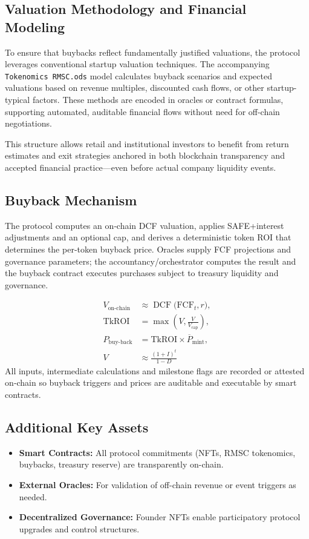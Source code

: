 \documentclass[conference]{IEEEtran}
\begin{document}
\subsection{Valuation Methodology and Financial Modeling}
To ensure that buybacks reflect fundamentally justified valuations, the protocol leverages conventional startup valuation techniques. The accompanying \texttt{Tokenomics RMSC.ods} model calculates buyback scenarios and expected valuations based on revenue multiples, discounted cash flows, or other startup-typical factors. These methods are encoded in oracles or contract formulas, supporting automated, auditable financial flows without need for off-chain negotiations.

This structure allows retail and institutional investors to benefit from return estimates and exit strategies anchored in both blockchain transparency and accepted financial practice—even before actual company liquidity events.

\subsection{Buyback Mechanism}
The protocol computes an on‑chain DCF valuation, applies SAFE+interest adjustments and an optional cap, and derives a deterministic token ROI that determines the per‑token buyback price. Oracles supply FCF projections and governance parameters; the accountancy/orchestrator computes the result and the buyback contract executes purchases subject to treasury liquidity and governance.


\begin{equation}
\begin{aligned}
V_{\text{on-chain}}
  &\approx \operatorname{DCF}\!\big(\mathrm{FCF}_t, r\big),\\[2pt]
\mathrm{TkROI}
  &= \max\!\left( V, \frac{V}{V_{\text{cap}}} \right),\\[2pt]
P_{\text{buy-back}}
  &= \mathrm{TkROI} \times \overline{P}_{\text{mint}},\\[4pt]
V &\approx \frac{(1+I)^{t}}{1-D}
\end{aligned}
\end{equation}
All inputs, intermediate calculations and milestone flags are recorded or attested on‑chain so buyback triggers and prices are auditable and executable by smart contracts.


\subsection{Additional Key Assets}
\begin{itemize}
    \item \textbf{Smart Contracts:} All protocol commitments (NFTs, RMSC tokenomics, buybacks, treasury reserve) are transparently on-chain.
    \item \textbf{External Oracles:} For validation of off-chain revenue or event triggers as needed.
    \item \textbf{Decentralized Governance:} Founder NFTs enable participatory protocol upgrades and control structures.
\end{itemize}
\end{document}
